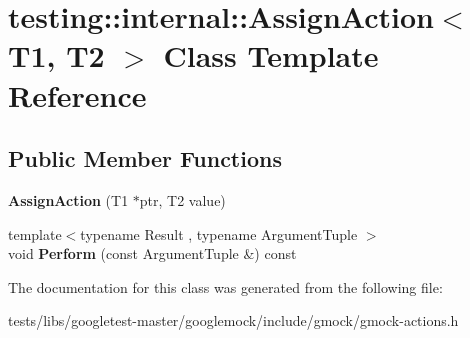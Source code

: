 \hypertarget{classtesting_1_1internal_1_1AssignAction}{}\section{testing\+:\+:internal\+:\+:Assign\+Action$<$ T1, T2 $>$ Class Template Reference}
\label{classtesting_1_1internal_1_1AssignAction}
\subsection*{Public Member Functions}
\begin{DoxyCompactItemize}
\item 
\mbox{\label{classtesting_1_1internal_1_1AssignAction_ae5a8fe8954ff3f8b26a08b57c3afdf9a}} 
{\bfseries Assign\+Action} (T1 $\ast$ptr, T2 value)
\item 
\mbox{\label{classtesting_1_1internal_1_1AssignAction_a540912bec1f4de6fc4c7de26312e4586}} 
{\footnotesize template$<$typename Result , typename Argument\+Tuple $>$ }\\void {\bfseries Perform} (const Argument\+Tuple \&) const
\end{DoxyCompactItemize}


The documentation for this class was generated from the following file\+:\begin{DoxyCompactItemize}
\item 
tests/libs/googletest-\/master/googlemock/include/gmock/gmock-\/actions.\+h\end{DoxyCompactItemize}
